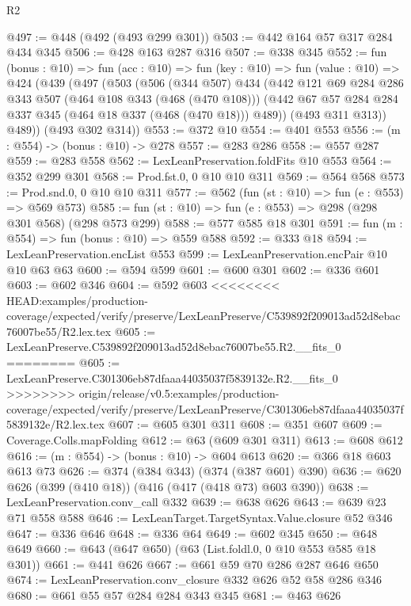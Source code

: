 \begin{lexlean}{R2}
\begin{coremodule}
{{{{{{{{{{{{{{{{{{{{{{@497 := @448 (@492 (@493 @299 @301))
@503 := @442 @164 @57 @317 @284 @434 @345
@506 := @428 @163 @287 @316
@507 := @338 @345
@552 := fun (bonus : @10) =>
  fun (acc : @10) =>
  fun (key : @10) =>
  fun (value : @10) =>
  @424
    (@439
      (@497
        (@503
          (@506
            (@344 @507)
            @434
            (@442
              @121
              @69
              @284
              @286
              @343
              @507
              (@464 @108 @343 (@468 (@470 @108)))
              (@442 @67 @57 @284 @284 @337 @345 (@464 @18 @337 (@468 (@470 @18))) @489))
            (@493 @311 @313))
          @489))
      (@493 @302 @314))
@553 := @372 @10
@554 := @401 @553
@556 := (m : @554) -> (bonus : @10) -> @278
@557 := @283 @286
@558 := @557 @287
@559 := @283 @558
@562 := LexLeanPreservation.foldFits @10 @553
@564 := @352 @299 @301
@568 := Prod.fst.{0, 0} @10 @10 @311
@569 := @564 @568
@573 := Prod.snd.{0, 0} @10 @10 @311
@577 := @562 (fun (st : @10) => fun (e : @553) => @569 @573)
@585 := fun (st : @10) => fun (e : @553) => @298 (@298 @301 @568) (@298 @573 @299)
@588 := @577 @585 @18 @301
@591 := fun (m : @554) => fun (bonus : @10) => @559 @588
@592 := @333 @18
@594 := LexLeanPreservation.encList @553
@599 := LexLeanPreservation.encPair @10 @10 @63 @63
@600 := @594 @599
@601 := @600 @301
@602 := @336 @601
@603 := @602 @346
@604 := @592 @603
<<<<<<<< HEAD:examples/production-coverage/expected/verify/preserve/LexLeanPreserve/C539892f209013ad52d8ebac76007be55/R2.lex.tex
@605 := LexLeanPreserve.C539892f209013ad52d8ebac76007be55.R2.__fits_0
========
@605 := LexLeanPreserve.C301306eb87dfaaa44035037f5839132e.R2.__fits_0
>>>>>>>> origin/release/v0.5:examples/production-coverage/expected/verify/preserve/LexLeanPreserve/C301306eb87dfaaa44035037f5839132e/R2.lex.tex
@607 := @605 @301 @311
@608 := @351 @607
@609 := Coverage.Colls.mapFolding
@612 := @63 (@609 @301 @311)
@613 := @608 @612
@616 := (m : @554) -> (bonus : @10) -> @604 @613
@620 := @366 @18 @603 @613 @73
@626 := @374 (@384 @343) (@374 (@387 @601) @390)
@636 := @620 @626 (@399 (@410 @18)) (@416 (@417 (@418 @73) @603 @390))
@638 := LexLeanPreservation.conv_call @332
@639 := @638 @626
@643 := @639 @23 @71 @558 @588
@646 := LexLeanTarget.TargetSyntax.Value.closure @52 @346
@647 := @336 @646
@648 := @336 @64
@649 := @602 @345
@650 := @648 @649
@660 := @643 (@647 @650) (@63 (List.foldl.{0, 0} @10 @553 @585 @18 @301))
@661 := @441 @626
@667 := @661 @59 @70 @286 @287 @646 @650
@674 := LexLeanPreservation.conv_closure @332 @626 @52 @58 @286 @346
@680 := @661 @55 @57 @284 @284 @343 @345
@681 := @463 @626
}}}}}}}}}}}}}}}}}}}}}}
\end{coremodule}
\end{lexlean}
